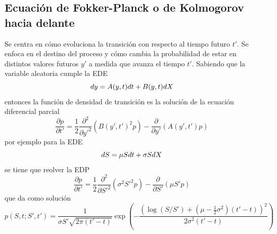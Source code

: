 \subsection{Ecuación de Fokker-Planck o de Kolmogorov hacia delante}
Se centra en cómo evoluciona la transición con respecto al tiempo futuro $t'$. Se enfoca en el destino del proceso y cómo cambia la probabilidad de estar en distintos valores futuros $y'$ a medida que avanza el tiempo $t'$. Sabiendo que la variable aleatoria cumple la EDE
\[
    dy = A(y, t) dt + B(y, t) d\mathnormal{X}
\]
entonces la función de densidad de transición es la solución de la ecuación diferencial parcial
\[
    \boxed{\frac{\partial p}{\partial t'} = \frac{1}{2} \frac{\partial^2}{\partial y'^2} \left( B(y', t')^2 p \right) - \frac{\partial}{\partial y'} \left( A(y', t') p \right)}
\]
por ejemplo para la EDE
\[
    dS = \mu S dt + \sigma S d\mathnormal{X}
\]
se tiene que reolver la EDP
\[
    \frac{\partial p}{\partial t'} = \frac{1}{2} \frac{\partial^2}{\partial S'^2} \left( \sigma^2 S'^2 p \right) - \frac{\partial}{\partial S'} \left( \mu S' p \right)
\]
que da como solución
\[
    p(S, t; S', t') = \frac{1}{\sigma S' \sqrt{2\pi (t'-t)}} \exp\left( -\frac{ \left( \log(S/S') + (\mu - \frac{1}{2}\sigma^2)(t'-t) \right)^2 }{ 2\sigma^2 (t'-t) } \right)
\]
